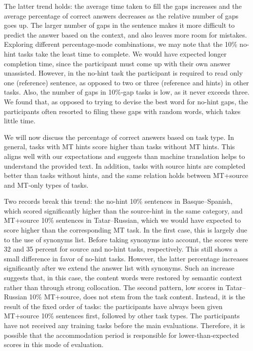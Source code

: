 \documentclass[11pt]{article}
\newcommand{\comment}[1]{\marginpar{\scriptsize\sf \textcolor{blue}{#1}}}
\begin{document}
The latter trend holds: the average time taken to fill the gaps increases and the average percentage of correct answers decreases as the relative number of gaps goes up. The larger number of gaps in the sentence makes it more
difficult to predict the answer based on the context, and also leaves more room for
mistakes. Exploring different percentage-mode combinations, we may note that the 10\% no-hint tasks take the least time to complete. We would have expected longer completion time, since the participant must come up with their own answer unassisted. However, in the no-hint task the participant is required to read only one (reference) sentence, as opposed to two or three (reference and hints) in other tasks. Also, the number of gaps in 10\%-gap tasks is low, as it never exceeds three. We found that, as opposed to trying to devise the best word for no-hint gaps, the participants often resorted to filing these gaps with random words, which takes little time.
\comment{EA: anything else I could write about times?}

We will now discuss the percentage of correct answers based on task type. In general, tasks with MT hints score higher than tasks without MT hints. This aligns well with our expectations and suggests than machine translation helps to understand the provided text. In addition, tasks with source hints are completed better than tasks without hints, and the same relation holds between MT+source and MT-only types of tasks. 

Two records break this trend: the no-hint 10\% sentences in Basque--Spanish, which scored significantly higher than the source-hint in the same category, and MT+source 10\% sentences in Tatar--Russian, which we would have expected to score higher than the corresponding MT task. In the first case, this is largely due to the use of synonyms list. Before taking synonyms into account, the scores were 32 and 35 percent for source and no-hint tasks, respectively. This still shows a small difference in favor of no-hint tasks. However, the latter percentage increases significantly after we extend the answer list with synonyms. Such an increase suggests that, in this case, the content words were restored by 
\comment{EA: to JA: I am not sure if this qualifies as common sense. What I meant is that people correctly guessed the meaning of the word in place, and expressed it in their own manner. Changed it to semantic context, is this a better rephrasing?}
semantic context rather than through strong collocation. The second pattern, low scores in Tatar--Russian 10\% MT+source, does not stem from the task content. Instead, it is the result of the fixed order of tasks: the participants have always been given MT+source 10\% sentences first, followed by other task types.\comment{MLF: Why? Not random? \cite{oregan13} did random! Why was this changed?} The participants have not received any training tasks before the main evaluations. Therefore, it is possible that the accommodation period is responsible for lower-than-expected scores in this mode of evaluation. 
\end{document}
